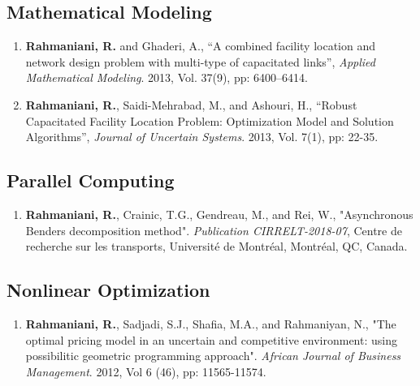 \documentclass[10PT,letter]{article}
\newcommand{\subsectionstyle}[1]{\normalfont\selectfont\textcolor{titlecol}{\sffamily #1}}
\begin{document}
		\subsection*{\subsectionstyle{Mathematical Modeling}}
			\begin{enumerate}[itemsep=.5mm]
           		 \item 
           		 			\textbf{Rahmaniani, R.} and Ghaderi, A., “A combined facility location and network design problem with multi-type of capacitated links”, \textit{Applied Mathematical Modeling}. 2013, Vol. 37(9), pp: 6400–6414.	
           		 \item
           		 			\textbf{Rahmaniani, R.}, Saidi-Mehrabad, M., and Ashouri, H., “Robust Capacitated Facility Location Problem: Optimization Model and Solution Algorithms”, \textit{Journal of Uncertain Systems}. 2013, Vol. 7(1), pp: 22-35.
       		 \end{enumerate}
		\subsection*{\subsectionstyle{Parallel Computing}}
				\begin{enumerate}[itemsep=.5mm]
					\item 
								\textbf{Rahmaniani, R.}, Crainic, T.G., Gendreau, M., and Rei, W., "Asynchronous Benders decomposition method". \textit{Publication CIRRELT-2018-07}, Centre de recherche sur les transports, Universit\'e de Montr\'eal, Montr\'eal, QC, Canada. 
				\end{enumerate}
		\subsection*{\subsectionstyle{Nonlinear Optimization}}
		\begin{enumerate}[itemsep=.5mm]
			\item 
					\textbf{Rahmaniani, R.}, Sadjadi, S.J.,    Shafia, M.A., and Rahmaniyan, N., "The optimal pricing model in an uncertain and competitive environment: using possibilitic geometric programming approach". \textit{African Journal of Business Management}. 2012, Vol 6 (46), pp: 11565-11574.
		\end{enumerate}
	
	
\end{document}
